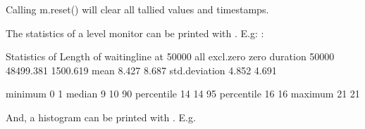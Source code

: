 \documentclass[letterpaper,10pt,english]{sphinxmanual}
\begin{document}
Calling m.reset() will clear all tallied values and timestamps.

The statistics of a level monitor can be printed with .
E.g: :

\begin{sphinxVerbatim}[commandchars=\\\{\}]
Statistics of Length of waitingline at     50000
                        all    excl.zero         zero
\PYGZhy{}\PYGZhy{}\PYGZhy{}\PYGZhy{}\PYGZhy{}\PYGZhy{}\PYGZhy{}\PYGZhy{}\PYGZhy{}\PYGZhy{}\PYGZhy{}\PYGZhy{}\PYGZhy{}\PYGZhy{} \PYGZhy{}\PYGZhy{}\PYGZhy{}\PYGZhy{}\PYGZhy{}\PYGZhy{}\PYGZhy{}\PYGZhy{}\PYGZhy{}\PYGZhy{}\PYGZhy{}\PYGZhy{} \PYGZhy{}\PYGZhy{}\PYGZhy{}\PYGZhy{}\PYGZhy{}\PYGZhy{}\PYGZhy{}\PYGZhy{}\PYGZhy{}\PYGZhy{}\PYGZhy{}\PYGZhy{} \PYGZhy{}\PYGZhy{}\PYGZhy{}\PYGZhy{}\PYGZhy{}\PYGZhy{}\PYGZhy{}\PYGZhy{}\PYGZhy{}\PYGZhy{}\PYGZhy{}\PYGZhy{}
duration          50000        48499.381     1500.619
mean                  8.427        8.687
std.deviation         4.852        4.691

minimum               0            1
median                9           10
90\PYGZpc{} percentile       14           14
95\PYGZpc{} percentile       16           16
maximum              21           21
\end{sphinxVerbatim}

And, a histogram can be printed with . E.g.

\begin{sphinxVerbatim}[commandchars=\\\{\}]
  
\end{sphinxVerbatim}
\end{document}
